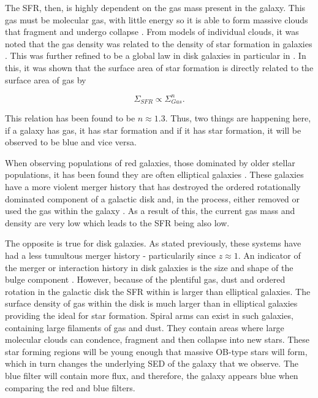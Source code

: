 The SFR, then, is highly dependent on the gas mass present in the galaxy. This gas must be molecular gas, with little energy so it is able to form massive clouds that fragment and undergo collapse \citep{1965MNRAS.130...97G, 1972ApJ...176L...9Q}. From models of individual clouds, it was noted that the gas density was related to the density of star formation in galaxies \citep{1959ApJ...129..243S}. This was further refined to be a global law in disk galaxies in particular in \citet{1998ApJ...498..541K}. In this, it was shown that the surface area of star formation is directly related to the surface area of gas by 

\begin{equation}\label{eq:ks-law}
	\Sigma_{SFR} \propto \Sigma_{Gas}^{n}. 
\end{equation}

\noindent This relation has been found to be $n\approx1.3$. Thus, two things are happening here, if a galaxy has gas, it has star formation and if it has star formation, it will be observed to be blue and vice versa.

When observing populations of red galaxies, those dominated by older stellar populations, it has been found they are often elliptical galaxies \citep{1992MNRAS.254..589B}. These galaxies have a more violent merger history that has destroyed the ordered rotationally dominated component of a galactic disk and, in the process, either removed or used the gas within the galaxy \citep{1976ApJ...204..365F}. As a result of this, the current gas mass and density are very low which leads to the SFR being also low.

The opposite is true for disk galaxies. As stated previously, these systems have had a less tumultous merger history - particularily since $z \approx 1$. An indicator of the merger or interaction history in disk galaxies is the size and shape of the bulge component \citep{2011MNRAS.414..888E}. However, because of the plentiful gas, dust and ordered rotation in the galactic disk the SFR within is larger than elliptical galaxies. The surface density of gas within the disk is much larger than in elliptical galaxies providing the ideal for star formation. Spiral arms can exist in such galaxies, containing large filaments of gas and dust. They contain areas where large molecular clouds can condence, fragment and then collapse into new stars. These star forming regions will be young enough that massive OB-type stars will form, which in turn changes the underlying SED of the galaxy that we observe. The blue filter will contain more flux, and therefore, the galaxy appears blue when comparing the red and blue filters.

